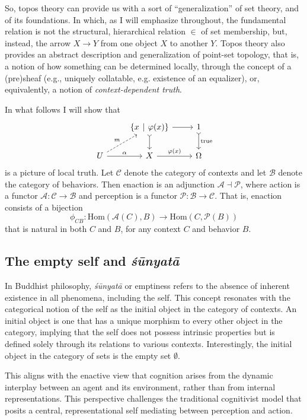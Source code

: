 \documentclass{article}
\begin{document}
So, topos theory can provide us with a sort of ``generalization'' of set theory, and of its foundations. In which, as I will emphasize throughout, the fundamental relation is not the structural, hierarchical relation $\in$ of set membership, but, instead, the arrow $X \to Y$ from one object $X$ to another $Y.$ Topos theory also provides an abstract description and generalization of point-set topology, that is, a notion of how something can be determined locally, through the concept of a (pre)sheaf (e.g., uniquely collatable, e.g. existence of an equalizer), or, equivalently, a notion of \emph{context-dependent truth}.

In what follows I will show that  
\[
\begin{tikzcd}
& \{ x \hspace{4px} | \hspace{4px} \varphi(x) \}  \arrow[r] \arrow[d, tail] & 1 \arrow[d, tail, "\text{true}"] \\
U \arrow[r, "\alpha"] \arrow[ru, dashed, "m"] & X \arrow[r, "\varphi(x)"] & \Omega
\end{tikzcd}
\]
is a picture of local truth. Let $\mathcal{C}$ denote the category of contexts and let $\mathcal{B}$ denote the category of behaviors. Then enaction is an adjunction $\mathcal{A} \dashv \mathcal{P}$, where action is a functor $\mathcal{A} \colon \mathcal{C} \to \mathcal{B}$ and perception is a functor $\mathcal{P} \colon \mathcal{B} \to \mathcal{C}$. That is, enaction consists of a bijection 
\[
\phi_{CB} \colon \text{Hom} ( \mathcal{A}(C), B ) \to \text{Hom}(C, \mathcal{P}(B))
\]
that is natural in both $C$ and $B$, for any context $C$ and behavior $B$.

\subsection{The empty self and \emph{śūnyatā}} \label{sec:self}

In Buddhist philosophy, \emph{śūnyatā} or emptiness refers to the absence of inherent existence in all phenomena, including the self. This concept resonates with the categorical notion of the self as the initial object in the category of contexts. An initial object is one that has a unique morphism to every other object in the category, implying that the self does not possess intrinsic properties but is defined solely through its relations to various contexts. Interestingly, the initial object in the category of sets is the empty set $\emptyset$.

This aligns with the enactive view that cognition arises from the dynamic interplay between an agent and its environment, rather than from internal representations. This perspective challenges the traditional cognitivist model that posits a central, representational self mediating between perception and action.
\end{document}
